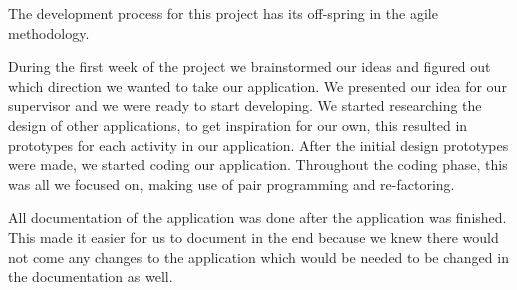 The development process for this project has its off-spring in the agile methodology. 

During the first week of the project we brainstormed our ideas and figured out which direction we wanted to take our application. We presented our idea for our supervisor and we were ready to start developing. We started researching the design of other applications, to get inspiration for our own, this resulted in prototypes for each activity in our application. After the initial design prototypes were made, we started coding our application. Throughout the coding phase, this was all we focused on, making use of pair programming and re-factoring. 

All documentation of the application was done after the application was finished. This made it easier for us to document in the end because we knew there would not come any changes to the application which would be needed to be changed in the documentation as well.
